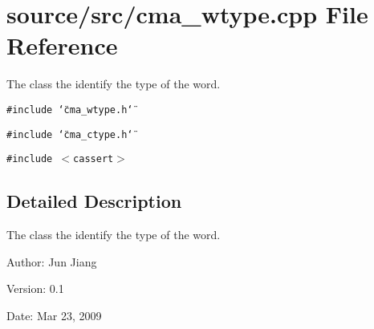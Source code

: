 \section{source/src/cma\_\-wtype.cpp File Reference}
\label{cma__wtype_8cpp}
The class the identify the type of the word.  


{\tt \#include \char`\"{}cma\_\-wtype.h\char`\"{}}\par
{\tt \#include \char`\"{}cma\_\-ctype.h\char`\"{}}\par
{\tt \#include $<$cassert$>$}\par


\subsection{Detailed Description}
The class the identify the type of the word. 

\begin{Desc}
\item[Author:]Jun Jiang \end{Desc}
\begin{Desc}
\item[Version:]0.1 \end{Desc}
\begin{Desc}
\item[Date:]Mar 23, 2009 \end{Desc}
